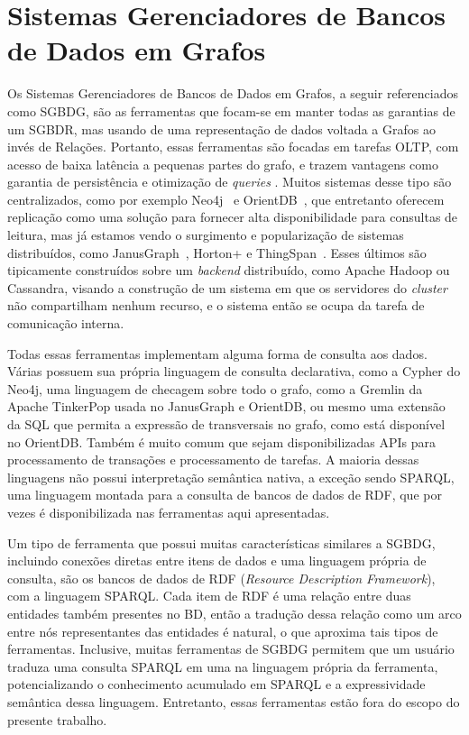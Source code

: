 \documentclass[conference]{IEEEtran}
\begin{document}
\section{Sistemas Gerenciadores de Bancos de Dados em Grafos}

Os Sistemas Gerenciadores de Bancos de Dados em Grafos, a seguir referenciados como SGBDG, são as ferramentas que focam-se em manter todas as garantias de um SGBDR, mas usando de uma representação de dados voltada a Grafos ao invés de Relações. Portanto, essas ferramentas são focadas em tarefas OLTP, com acesso de baixa latência a pequenas partes do grafo, e trazem vantagens como garantia de persistência e otimização de \emph{queries} \cite{nole-sartiani}. Muitos sistemas desse tipo são centralizados, como por exemplo Neo4j~\cite{neo4j} e OrientDB~\cite{orientdb}, que entretanto oferecem replicação como uma solução para fornecer alta disponibilidade para consultas de leitura, mas já estamos vendo o surgimento e popularização de sistemas distribuídos, como JanusGraph~\cite{janusgraph}, Horton+ \cite{horton} e ThingSpan~\cite{thingspan}. Esses últimos são tipicamente construídos sobre um \emph{backend} distribuído, como Apache Hadoop ou Cassandra, visando a construção de um sistema em que os servidores do \emph{cluster} não compartilham nenhum recurso, e o sistema então se ocupa da tarefa de comunicação interna.

Todas essas ferramentas implementam alguma forma de consulta aos dados. Várias possuem sua própria linguagem de consulta declarativa, como a Cypher do Neo4j, uma linguagem de checagem sobre todo o grafo, como a Gremlin da Apache TinkerPop usada no JanusGraph e OrientDB, ou mesmo uma extensão da SQL que permita a expressão de transversais no grafo, como está disponível no OrientDB. Também é muito comum que sejam disponibilizadas APIs para processamento de transações e processamento de tarefas. A maioria dessas linguagens não possui interpretação semântica nativa, a exceção sendo SPARQL, uma linguagem montada para a consulta de bancos de dados de RDF, que por vezes é disponibilizada nas ferramentas aqui apresentadas.

Um tipo de ferramenta que possui muitas características similares a SGBDG, incluindo conexões diretas entre itens de dados e uma linguagem própria de consulta, são os bancos de dados de RDF (\emph{Resource Description Framework}), com a linguagem SPARQL. Cada item de RDF é uma relação entre duas entidades também presentes no BD, então a tradução dessa relação como um arco entre nós representantes das entidades é natural, o que aproxima tais tipos de ferramentas. Inclusive, muitas ferramentas de SGBDG permitem que um usuário traduza uma consulta SPARQL em uma na linguagem própria da ferramenta, potencializando o conhecimento acumulado em SPARQL e a expressividade semântica dessa linguagem. Entretanto, essas ferramentas estão fora do escopo do presente trabalho.
\end{document}
